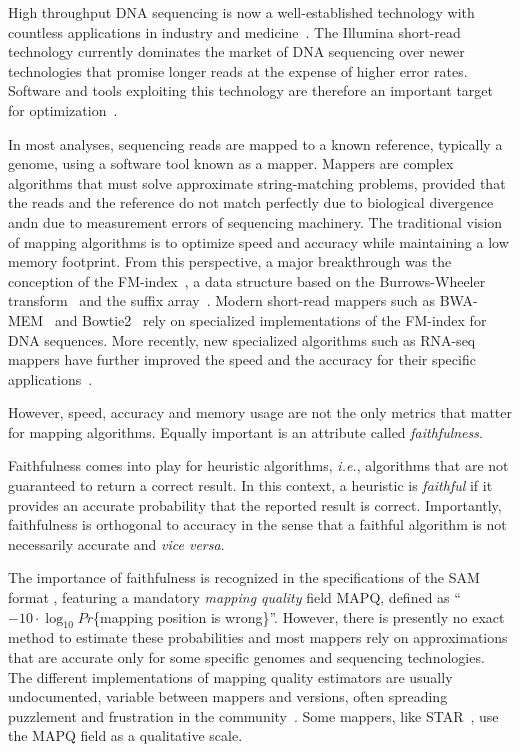 \documentclass[a4,center,fleqn]{NAR}
\begin{document}
High throughput DNA sequencing is now a well-established technology with
countless applications in industry and medicine~\cite{pmid30084865}. The
Illumina short-read technology currently dominates the market of DNA
sequencing over newer technologies that promise longer reads at the
expense of higher error rates. Software and tools exploiting this technology
are therefore an important target for optimization~\cite{Wikillu}.

In most analyses, sequencing reads are mapped to a known reference, typically
a genome, using a software tool known as a mapper. Mappers are complex
algorithms that must solve approximate string-matching problems, provided that
the reads and the reference do not match perfectly due to biological divergence
andn due to measurement errors of sequencing machinery. The traditional vision
of mapping algorithms is to optimize speed and accuracy while maintaining a low
memory footprint. From this perspective, a major breakthrough was the
conception of the FM-index~\cite{ferragina2000opportunistic,
ferragina2005indexing}, a data structure based on the Burrows-Wheeler
transform~\cite{burrows1994block} and the suffix
array~\cite{manber1993suffix}. Modern short-read mappers such as
BWA-MEM~\cite{li2013aligning} and Bowtie2~\cite{pmid22388286} rely on
specialized implementations of the FM-index for DNA sequences. More
recently, new specialized algorithms such as RNA-seq mappers have further improved
the speed and the accuracy for their specific applications~\cite{pmid27043002}.

However, speed, accuracy and memory usage are not the only metrics that
matter for mapping algorithms. Equally important is an attribute called
\emph{faithfulness}.

Faithfulness comes into play for heuristic algorithms, \textit{i.e.},
algorithms that are not guaranteed to return a correct result. In this context,
a heuristic is \emph{faithful} if it provides an accurate probability that the
reported result is correct. Importantly, faithfulness is orthogonal to accuracy
in the sense that a faithful algorithm is not necessarily accurate and
\textit{vice versa}.

\enlargethispage{-65.1pt}

The importance of faithfulness is recognized in the specifications of the
SAM format \cite{pmid19505943}, featuring a mandatory \emph{mapping
quality} field MAPQ, defined as ``$-10 \cdot \log_{10}Pr$\{mapping
position is wrong\}''. However, there is presently no exact method to
estimate these probabilities and most mappers rely on approximations
that are accurate only for some specific genomes and sequencing technologies.
The different implementations of mapping quality estimators are usually
undocumented, variable between mappers and versions, often spreading
puzzlement and frustration in the community~\cite{ACGT, QCFail}.
Some mappers, like STAR~\cite{pmid23104886}, use the MAPQ field as a
qualitative scale.
\end{document}
